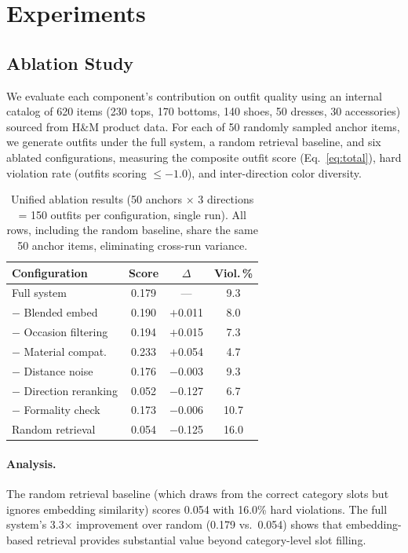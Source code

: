 \documentclass[10pt,twocolumn]{article}
\begin{document}
\section{Experiments}
\label{sec:experiments}

\subsection{Ablation Study}

We evaluate each component's contribution on outfit quality using an
internal catalog of 620 items (230 tops, 170 bottoms, 140 shoes,
50 dresses, 30 accessories) sourced from H\&M product data.
For each of 50 randomly sampled anchor items, we
generate outfits under the full system, a random retrieval baseline,
and six ablated configurations,
measuring the composite outfit score (Eq.~\ref{eq:total}), hard violation
rate (outfits scoring $\leq -1.0$), and inter-direction color diversity.

\begin{table}[t]
\centering
\small
\caption{Unified ablation results (50 anchors $\times$ 3 directions = 150
outfits per configuration, single run).  All rows, including the random
baseline, share the same 50 anchor items, eliminating cross-run variance.}
\label{tab:ablation}
\begin{tabular}{lccc}
\toprule
Configuration & Score & $\Delta$ & Viol.\,\% \\
\midrule
Full system              & 0.179 & ---      &  9.3 \\
$-$ Blended embed        & 0.190 & $+$0.011 &  8.0 \\
$-$ Occasion filtering   & 0.194 & $+$0.015 &  7.3 \\
$-$ Material compat.     & 0.233 & $+$0.054 &  4.7 \\
$-$ Distance noise       & 0.176 & $-$0.003 &  9.3 \\
$-$ Direction reranking  & 0.052 & $-$0.127 &  6.7 \\
$-$ Formality check      & 0.173 & $-$0.006 & 10.7 \\
\midrule
Random retrieval         & 0.054 & $-$0.125 & 16.0 \\
\bottomrule
\end{tabular}
\end{table}

\paragraph{Analysis.}
The random retrieval baseline (which draws from the correct category
slots but ignores embedding similarity) scores 0.054 with 16.0\% hard
violations.  The full system's 3.3$\times$ improvement over random (0.179
vs.\ 0.054) shows that embedding-based retrieval provides substantial
value beyond category-level slot filling.
\end{document}
